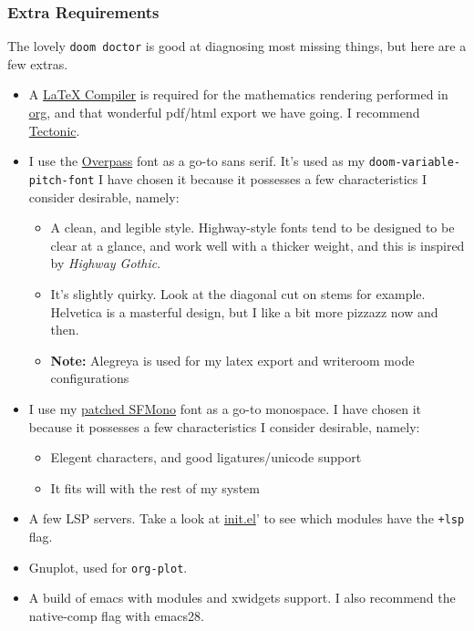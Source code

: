 \documentclass{scrartcl}
\begin{document}
\subsubsection{Extra Requirements}
\label{sec:org9a75d71}
The lovely \texttt{doom doctor} is good at diagnosing most missing things, but here are a
few extras.
\begin{itemize}
\item A \href{https://www.tug.org/texlive/}{\LaTeX{} Compiler} is required for the mathematics rendering performed in \href{https://orgmode.org/}{org},
and that wonderful pdf/html export we have going. I recommend \href{https://github.com/tectonic-typesetting/tectonic}{Tectonic}.
\item I use the \href{https://overpassfont.org/}{Overpass} font as a go-to sans serif.
It's used as my \texttt{doom-variable-pitch-font}
I have chosen it because it possesses a few characteristics I consider
desirable, namely:
\begin{itemize}
\item A clean, and legible style. Highway-style fonts tend to be designed to be
clear at a glance, and work well with a thicker weight, and this is inspired
by \emph{Highway Gothic}.
\item It's slightly quirky. Look at the diagonal cut on stems for example.
Helvetica is a masterful design, but I like a bit more pizzazz now and then.
\item \textbf{Note:} Alegreya is used for my latex export and writeroom mode configurations
\end{itemize}
\item I use my \href{https://github.com/shaunsingh/SFMono-Nerd-Font-Ligaturized}{patched SFMono} font as a go-to monospace.
I have chosen it because it possesses a few characteristics I consider
desirable, namely:
\begin{itemize}
\item Elegent characters, and good ligatures/unicode support
\item It fits will with the rest of my system
\end{itemize}
\item A few LSP servers. Take a look at \href{init.el}{init.el}' to see which modules have the \texttt{+lsp}
flag.
\item Gnuplot, used for \texttt{org-plot}.
\item A build of emacs with modules and xwidgets support. I also recommend the
native-comp flag with emacs28.
\end{itemize}
\end{document}
